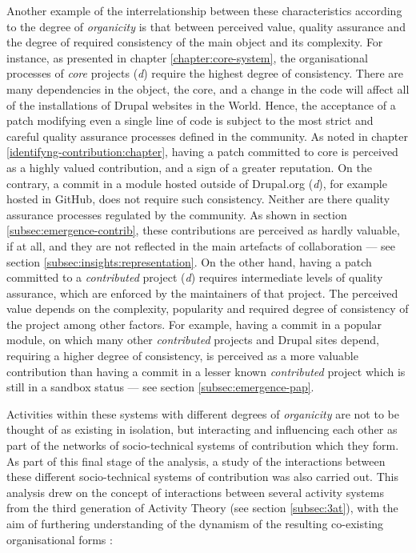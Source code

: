 Another example of the interrelationship between these characteristics according to the degree of \textit{organicity} is that between perceived value, quality assurance and the degree of required consistency of the main object and its complexity. For instance, as presented in chapter \ref{chapter:core-system}, the organisational processes of \textit{core} projects (\textsl{d}) require the highest degree of consistency. There are many dependencies in the object, the core, and a change in the code will affect all of the installations of Drupal websites in the World. Hence, the acceptance of a patch modifying even a single line of code is subject to the most strict and careful quality assurance processes defined in the community. As noted in chapter \ref{identifyng-contribution:chapter}, having a patch committed to core is perceived as a highly valued contribution, and a sign of a greater reputation. On the contrary, a commit in a module hosted outside of Drupal.org (\textsl{d}), for example hosted in GitHub, does not require such consistency. Neither are there quality assurance processes regulated by the community. As shown in section \ref{subsec:emergence-contrib}, these contributions are perceived as hardly valuable, if at all, and they are not reflected in the main artefacts of collaboration --- see section \ref{subsec:insights:representation}. On the other hand, having a patch committed to a \textit{contributed} project (\textsl{d}) requires intermediate levels of quality assurance, which are enforced by the maintainers of that project. The perceived value depends on the complexity, popularity and required degree of consistency of the project among other factors. For example, having a commit in a popular module, on which many other \textit{contributed} projects and Drupal sites depend, requiring a higher degree of consistency, is perceived as a more valuable contribution than having a commit in a lesser known \textit{contributed} project which is still in a sandbox status --- see section \ref{subsec:emergence-pap}.


Activities within these systems with different degrees of \textit{organicity} are not to be thought of as existing in isolation, but interacting and influencing each other as part of the networks of socio-technical systems of contribution which they form. As part of this final stage of the analysis, a study of the interactions between these different socio-technical systems of contribution was also carried out. This analysis drew on the concept of interactions between several activity systems from the third generation of Activity Theory (see section \ref{subsec:3at}), with the aim of furthering understanding of the dynamism of the resulting co-existing organisational forms \parencite[34]{kuutti1996activity}:


